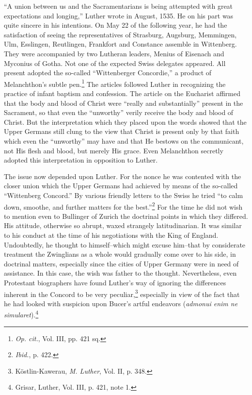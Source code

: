 “A union between us and the Sacramentarians is being attempted
with great expectations and longing,” Luther wrote in August, 1535.
He on his part was quite sincere in his intentions. On May 22 of the
following year, he had the satisfaction of seeing the representatives
of Strasburg, Augsburg, Memmingen, Ulm, Esslingen, Reutlingen,
Frankfort and Constance assemble in Wittenberg. They were accompanied
by two Lutheran leaders, Menius of Eisenach and Myconius
of Gotha. Not one of the expected Swiss delegates appeared. All
present adopted the so-called “Wittenberger Concordie,” a product
of Melanchthon’s subtle pen.\footnote{\textit{Op. cit.}, Vol. III, pp. 421 sq.}
 The articles followed Luther in
recognizing the practice of infant baptism and confession. The article
on the Eucharist affirmed that the body and blood of Christ were
“really and substantially” present in the Sacrament, so that even
the “unworthy” verily receive the body and blood of Christ. But
the interpretation which they placed upon the words showed that
the Upper Germans still clung to the view that Christ is present only
by that faith which even the “unworthy” may have and that He bestows
on the communicant, not His flesh and blood, but merely His
grace. Even Melanchthon secretly adopted this interpretation in opposition
to Luther.

The issue now depended upon Luther. For the nonce he was
contented with the closer union which the Upper Germans had
achieved by means of the so-called “Wittenberg Concord.” By
various friendly letters to the Swiss he tried “to calm down, smoothe,
and further matters for the best.”\footnote{\textit{Ibid.}, p. 422.}
 For the time he did not wish to
mention even to Bullinger of Zurich the doctrinal points in which
they differed. His attitude, otherwise so abrupt, waxed strangely
latitudinarian. It was similar to his conduct at the time of his
negotiations with the King of England. Undoubtedly, he thought
to himself--which might excuse him--that by considerate treatment the
Zwinglians as a whole would gradually come over to his
side, in doctrinal matters, especially since the cities of Upper Germany
were in need of assistance. In this case, the wish was father to
the thought. Nevertheless, even Protestant biographers have found
Luther’s way of ignoring the differences inherent in the Concord to
be very peculiar,\footnote{Köstlin-Kawerau, \textit{M. Luther}, Vol. II, p. 348.}
 especially in view of the fact that he had looked
with suspicion upon Bucer’s artful endeavors (\textit{admonui enim ne
simularet}).\footnote{Grisar, Luther, Vol. III, p. 421, note 1.}


